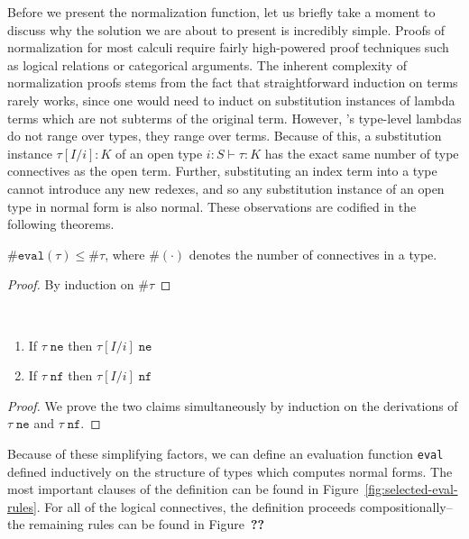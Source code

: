 Before we present the normalization function, let us briefly take a moment to discuss why the solution we are about to present is incredibly simple. Proofs of normalization for most calculi require fairly high-powered proof techniques such as logical relations or categorical arguments. The inherent complexity of normalization proofs stems from the fact that straightforward induction on terms rarely works, since one would need to induct on substitution instances of lambda terms which are not subterms of the original term. However, \dlambdaamor's type-level lambdas do not range over types, they range over terms. Because of this, a substitution instance $\tau[I/i] : K$ of an open type $i : S \vdash \tau : K$ has the exact same number of type connectives as the open term. Further, substituting an index term into a type cannot introduce any new redexes, and so any substitution instance of an open type in normal form is also normal. These observations are codified in the following theorems.

\begin{theorem}
$\#\texttt{eval}(\tau) \leq \#\tau$, where $\#(\cdot)$ denotes the number of connectives in a type.
\end{theorem}
\begin{proof}
By induction on $\#\tau$
\end{proof}


\begin{theorem}
~\begin{enumerate}
  \item If $\tau \; \texttt{ne}$ then $\tau[I/i] \; \texttt{ne}$
  \item If $\tau \; \texttt{nf}$ then $\tau[I/i] \; \texttt{nf}$
\end{enumerate}
\label{thm:idx-subst-nf}
\end{theorem}
\begin{proof}
We prove the two claims simultaneously by induction on the derivations of $\tau \; \texttt{ne}$ and $\tau \; \texttt{nf}$.
\end{proof}

Because of these simplifying factors, we can define an evaluation function \texttt{eval} defined inductively on the structure of types which computes normal forms.
The most important clauses of the definition can be found in Figure~\ref{fig:selected-eval-rules}. For all of the logical connectives, the definition proceeds compositionally-- the remaining rules can be found in Figure~\textbf{??}


